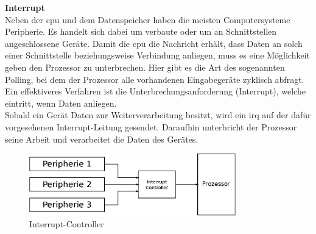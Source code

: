  \textbf{Interrupt}\\
 Neben der \ac{cpu} und dem Datenspeicher haben die meisten Computersysteme Peripherie. Es handelt sich dabei um verbaute oder um an Schnittstellen angeschlossene Geräte.
 Damit die \ac{cpu} die Nachricht erhält, dass Daten an solch einer Schnittstelle beziehungsweise Verbindung anliegen, muss es eine Möglichkeit geben den Prozessor zu
 unterbrechen. Hier gibt es die Art des sogenannten Polling, bei dem der Prozessor alle vorhandenen Eingabegeräte zyklisch abfragt. Ein effektiveres Verfahren ist die
 Unterbrechungsanforderung (Interrupt), welche eintritt, wenn Daten anliegen. \\
 Sobald ein Gerät Daten zur Weiterverarbeitung besitzt, wird ein \ac{irq} auf der dafür vorgesehenen Interrupt-Leitung gesendet. Daraufhin unterbricht der Prozessor
 seine Arbeit und verarbeitet die Daten des Gerätes.\cite{irq}\\

 \begin{figure}[H]
 \centering
 \includegraphics[width=0.8\textwidth]{Hauptteil/irq.eps}
 \caption{Interrupt-Controller}\label{fig:irq}
 \end{figure}

\newpage


